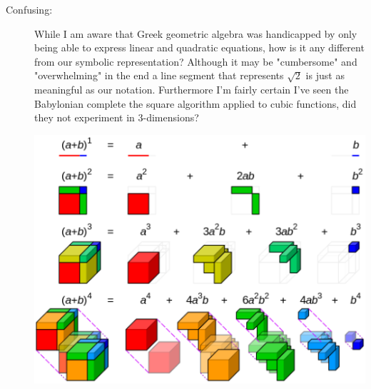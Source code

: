 \documentclass[12pt]{article}
\theoremstyle{homework}
\begin{document}
\begin{description}
 

\item[Confusing:] While I am aware that Greek geometric algebra was handicapped by only being able to express linear and quadratic equations, how is it any different from our symbolic representation?
Although it may be "cumbersome" and "overwhelming" in the end a line segment that represents $\sqrt{2}$ is just as meaningful as our notation. Furthermore I'm fairly certain I've seen the Babylonian 
complete the square algorithm applied to cubic functions, did they not experiment in 3-dimensions?
\begin{center}
  \includegraphics[width = .75\textwidth]{solve.png}        
\end{center}

\end{description}
\end{document}
